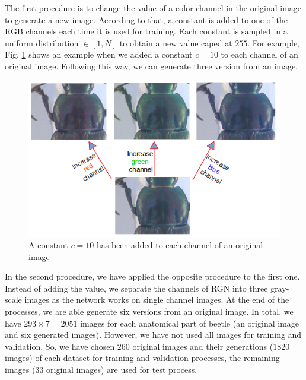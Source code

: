 The first procedure is to change the value of a color channel in the original image to generate a new image. According to that, a constant is added to one of the RGB channels each time it is used for training. Each constant is sampled in a uniform distribution $\in [1, N]$ to obtain a new value caped at $255$. For example, Fig. \ref{figaug1} shows an example when we added a constant $c = 10$ to each channel of an original image. Following this way, we can generate three version from an image.
\begin{figure}[h]
	\centering
	\includegraphics[scale=0.5]{images/inc_channels}
	\caption{A constant $c = 10$ has been added to each channel of an original image}
	\label{figaug1}
\end{figure}

In the second procedure, we have applied the opposite procedure to the first one. Instead of adding the value, we separate the channels of RGN into three gray-scale images as the network works on single channel images. At the end of the processes, we are able generate six versions from an original image. In total, we have $293 \times 7 = 2051$ images for each anatomical part of beetle (an original image and six generated images). However, we have not used all images for training and validation. So, we have chosen $260$ original images and their generations ($1820$ images) of each dataset for training and validation processes, the remaining images ($33$ original images) are used for test process.

